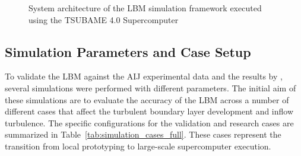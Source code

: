 \begin{figure}[H]
    \caption{System architecture of the LBM simulation framework executed using the TSUBAME 4.0 Supercomputer}
    \label{fig:tsubame_arch}
\end{figure}

\newpage
\subsection{Simulation Parameters and Case Setup}

To validate the LBM against the AIJ experimental data and the results by \textcite{Okaze2021LES}, several simulations were performed with different parameters. The initial aim of these simulations are to evaluate the accuracy of the LBM across a number of different cases that affect the turbulent boundary layer development and inflow turbulence. The specific configurations for the validation and research cases are summarized in Table~\ref{tab:simulation_cases_full}. These cases represent the transition from local prototyping to large-scale supercomputer execution.

